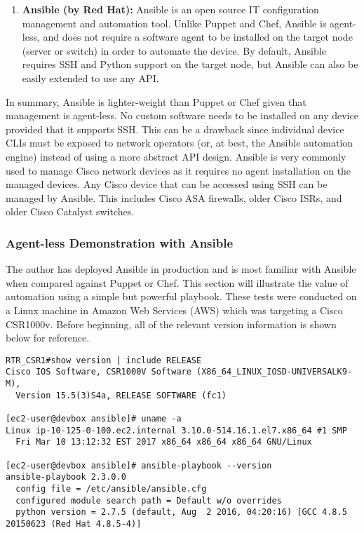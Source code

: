 \begin{enumerate}
  \item \textbf{Ansible (by Red Hat):} Ansible is an open source IT
  configuration management and automation tool. Unlike Puppet and Chef,
  Ansible is agent-less, and does not require a software agent to be installed
  on the target node (server or switch) in order to automate the device. By
  default, Ansible requires SSH and Python support on the target node, but
  Ansible can also be easily extended to use any API\@.
\end{enumerate}

In summary, Ansible is lighter-weight than Puppet or Chef given that
management is agent-less. No custom software needs to be installed on any
device provided that it supports SSH\@. This can be a drawback since individual
device CLIs must be exposed to network operators (or, at best, the Ansible
automation engine) instead of using a more abstract API design. Ansible is
very commonly used to manage Cisco network devices as it requires no agent
installation on the managed devices. Any Cisco device that can be accessed
using SSH can be managed by Ansible. This includes Cisco ASA firewalls, older
Cisco ISRs, and older Cisco Catalyst switches.

\subsubsection{Agent-less Demonstration with Ansible}
The author has deployed Ansible in production and is most familiar with
Ansible when compared against Puppet or Chef. This section will illustrate the
value of automation using a simple but powerful playbook. These tests were
conducted on a Linux machine in Amazon Web Services (AWS) which was targeting
a Cisco CSR1000v. Before beginning, all of the relevant version information is
shown below for reference.

\begin{verbatim}
RTR_CSR1#show version | include RELEASE  
Cisco IOS Software, CSR1000V Software (X86_64_LINUX_IOSD-UNIVERSALK9-M),
  Version 15.5(3)S4a, RELEASE SOFTWARE (fc1)

[ec2-user@devbox ansible]# uname -a
Linux ip-10-125-0-100.ec2.internal 3.10.0-514.16.1.el7.x86_64 #1 SMP
  Fri Mar 10 13:12:32 EST 2017 x86_64 x86_64 x86_64 GNU/Linux

[ec2-user@devbox ansible]# ansible-playbook --version
ansible-playbook 2.3.0.0
  config file = /etc/ansible/ansible.cfg
  configured module search path = Default w/o overrides
  python version = 2.7.5 (default, Aug  2 2016, 04:20:16) [GCC 4.8.5 20150623 (Red Hat 4.8.5-4)]
\end{verbatim}

